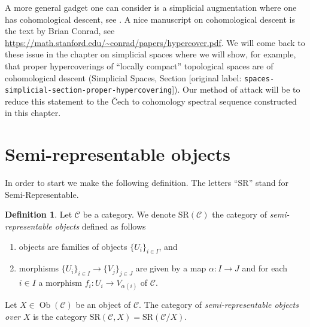 \documentclass[10pt,a4paper]{article}
\theoremstyle{plain}
\theoremstyle{definition}
\newtheorem{definition}[subsection]{Definition}
\theoremstyle{remark}
\numberwithin{equation}{subsection}
\def\Ob{\mathop{\mathrm{Ob}}\nolimits}
\begin{document}
\medskip\noindent
A more general gadget one can consider is a simplicial augmentation where
one has cohomological descent, see \cite[Expos\'e Vbis]{SGA4}. A nice
manuscript on cohomological descent is the text by Brian Conrad, see
\url{https://math.stanford.edu/~conrad/papers/hypercover.pdf}.
We will come back to these issue in the chapter on simplicial spaces
where we will show, for example, that proper hypercoverings of
``locally compact'' topological spaces are of cohomological
descent (Simplicial Spaces, Section
\textnormal{[original label: \nolinkurl{spaces-simplicial-section-proper-hypercovering}]}).
Our method of attack will be to reduce this statement to the {\v C}ech to
cohomology spectral sequence constructed in this chapter.






























\section{Semi-representable objects}
\label{section-semi-representable}

\noindent
In order to start we make the following definition.
The letters ``SR'' stand for Semi-Representable.

\begin{definition}
\label{definition-SR}
Let $\mathcal{C}$ be a category. We denote $\text{SR}(\mathcal{C})$
the category of {\it semi-representable objects} defined as follows
\begin{enumerate}
\item objects are families of objects $\{U_i\}_{i \in I}$, and
\item morphisms $\{U_i\}_{i \in I} \to \{V_j\}_{j \in J}$ are given by
a map $\alpha : I \to J$ and for each $i \in I$
a morphism $f_i : U_i \to V_{\alpha(i)}$ of $\mathcal{C}$.
\end{enumerate}
Let $X \in \Ob(\mathcal{C})$ be an object of $\mathcal{C}$.
The category of {\it semi-representable objects over $X$}
is the category
$\text{SR}(\mathcal{C}, X) = \text{SR}(\mathcal{C}/X)$.
\end{definition}
\end{document}
